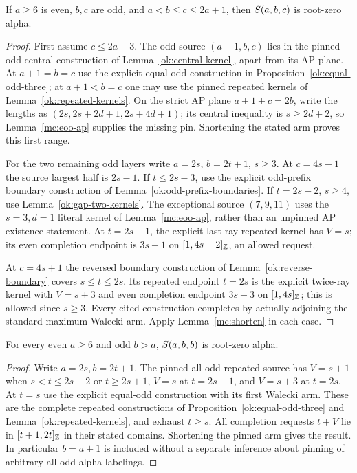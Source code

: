 \begin{proposition}\label{mc:eoo-central}
If $a\ge6$ is even, $b,c$ are odd, and
$a<b\le c\le2a+1$, then $S\!\left(a,b,c\right)$ is root-zero alpha.
\end{proposition}
\begin{proof}
First assume $c\le2a-3$.  The odd source $(a+1,b,c)$ lies
in the pinned odd central construction of
Lemma~\ref{ok:central-kernel}, apart from its AP plane.
At $a+1=b=c$ use the explicit equal-odd construction in
Proposition~\ref{ok:equal-odd-three}; at $a+1<b=c$ one may use
the pinned repeated kernels of Lemma~\ref{ok:repeated-kernels}.
On the strict AP plane $a+1+c=2b$, write the lengths as
$(2s,2s+2d+1,2s+4d+1)$; its central inequality is
$s\ge2d+2$, so Lemma~\ref{mc:eoo-ap} supplies the missing pin.
Shortening the stated arm proves this first range.

For the two remaining odd layers write $a=2s$, $b=2t+1$,
$s\ge3$.  At $c=4s-1$ the source largest half is $2s-1$.
If $t\le2s-3$, use the explicit odd-prefix boundary construction
of Lemma~\ref{ok:odd-prefix-boundaries}.  If $t=2s-2$,
$s\ge4$, use Lemma~\ref{ok:gap-two-kernels}.  The exceptional
source $(7,9,11)$ uses the $s=3,d=1$ literal kernel of
Lemma~\ref{mc:eoo-ap}, rather than an unpinned AP existence
statement.  At $t=2s-1$, the explicit last-ray repeated kernel
has $V=s$; its even completion endpoint is $3s-1$ on
$[1,4s-2]_{\mathbb Z}$, an allowed request.

At $c=4s+1$ the reversed boundary construction of
Lemma~\ref{ok:reverse-boundary} covers $s\le t\le2s$.
Its repeated endpoint $t=2s$ is the explicit twice-ray kernel with
$V=s+3$ and even completion endpoint $3s+3$ on
$[1,4s]_{\mathbb Z}$; this is allowed since $s\ge3$.
Every cited construction completes by actually adjoining the standard
maximum-Walecki arm.  Apply Lemma~\ref{mc:shorten} in each case.
\end{proof}

\begin{proposition}\label{mc:eoo-repeated}
For every even $a\ge6$ and odd $b>a$, $S\!\left(a,b,b\right)$ is
root-zero alpha.
\end{proposition}
\begin{proof}
Write $a=2s,b=2t+1$.  The pinned all-odd repeated source has
$V=s+1$ when $s<t\le2s-2$ or $t\ge2s+1$, $V=s$ at
$t=2s-1$, and $V=s+3$ at $t=2s$.  At $t=s$ use the explicit
equal-odd construction with its first Walecki arm.  These are the
complete repeated constructions of Proposition~\ref{ok:equal-odd-three}
and Lemma~\ref{ok:repeated-kernels}, and exhaust $t\ge s$.
All completion requests $t+V$ lie in $[t+1,2t]_{\mathbb Z}$ in
their stated domains.  Shortening the pinned arm gives the result.
In particular $b=a+1$ is included without a separate inference
about pinning of arbitrary all-odd alpha labelings.
\end{proof}

